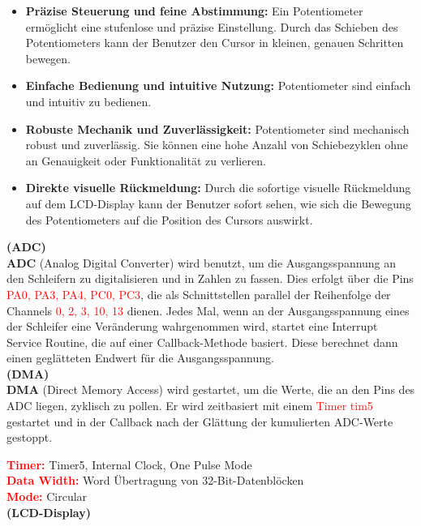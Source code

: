 \begin{itemize}
	\item \textbf{Präzise Steuerung und feine Abstimmung:} Ein Potentiometer ermöglicht eine stufenlose und präzise Einstellung. Durch das Schieben des Potentiometers kann der Benutzer den Cursor in kleinen, genauen Schritten bewegen.
	\item \textbf{Einfache Bedienung und intuitive Nutzung:} Potentiometer sind einfach und intuitiv zu bedienen.
	\item \textbf{Robuste Mechanik und Zuverlässigkeit:} Potentiometer sind mechanisch robust und zuverlässig. Sie können eine hohe Anzahl von Schiebezyklen ohne an Genauigkeit oder Funktionalität zu verlieren.
	\item \textbf{Direkte visuelle Rückmeldung:} Durch die sofortige visuelle Rückmeldung auf dem LCD-Display kann der Benutzer sofort sehen, wie sich die Bewegung des Potentiometers auf die Position des Cursors auswirkt.
\end{itemize}

\textbf{(ADC)}\\

\textbf{ADC} (Analog Digital Converter) wird benutzt, um die Ausgangsspannung an den Schleifern zu digitalisieren und in Zahlen zu fassen. Dies erfolgt über die Pins \textcolor{red}{PA0, PA3, PA4, PC0, PC3}, die als Schnittstellen parallel der Reihenfolge der Channels \textcolor{red}{0, 2, 3, 10, 13} dienen. Jedes Mal, wenn an der Ausgangsspannung eines der Schleifer eine Veränderung wahrgenommen wird, startet eine Interrupt Service Routine, die auf einer Callback-Methode basiert. Diese berechnet dann einen geglätteten Endwert für die Ausgangsspannung. \\

\textbf{(DMA)}\\

\textbf{DMA} (Direct Memory Access) wird gestartet, um die Werte, die an den Pins des ADC liegen, zyklisch zu pollen. Er wird zeitbasiert mit einem \textcolor{red}{Timer tim5} gestartet und in der Callback nach der Glättung der kumulierten ADC-Werte gestoppt.

\textbf{\textcolor{red}{Timer:}} Timer5, Internal Clock, One Pulse Mode \\
\textbf{\textcolor{red}{Data Width:}} Word Übertragung von 32-Bit-Datenblöcken \\
\textbf{\textcolor{red}{Mode:}} Circular \\

\textbf{(LCD-Display)}\\

